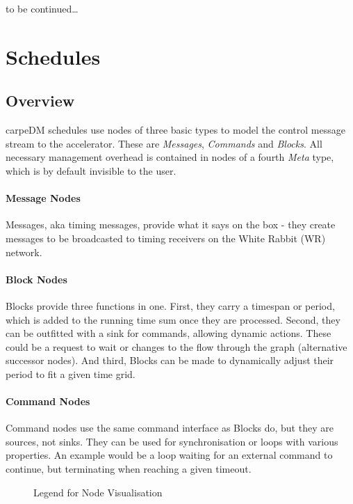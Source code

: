 to be continued\dots

\section{Schedules}

\subsection{Overview}

carpeDM schedules use nodes of three basic types to model the control message stream to the accelerator. These are \emph{Messages}, \emph{Commands} and \emph{Blocks}. All necessary management overhead is contained in nodes of a fourth \emph{Meta} type, which is by default invisible to the user.

\paragraph{Message Nodes}
Messages, aka timing messages, provide what it says on the box - they create messages to be broadcasted to timing receivers on the White Rabbit (WR) network.
\paragraph{Block Nodes}
Blocks provide three functions in one. First, they carry a timespan or period, which is added to the running time sum once they are processed. Second, they can be outfitted with a sink for commands, allowing dynamic actions. These could be a request to wait or changes to the flow through the graph (alternative successor nodes). And third, Blocks can be made to dynamically adjust their period to fit a given time grid.
\paragraph{Command Nodes} Command nodes use the same command interface as Blocks do, but they are sources, not sinks. They can be used for synchronisation or loops with various properties. An example would be a loop waiting for an external command to continue, but terminating when reaching a given timeout.

\begin{figure}[H]
\def\svgwidth{0.8\textwidth}
\graphicspath{{Figures/}}

\caption{Legend for Node Visualisation }
\label{fig:legend_nodes}
\end{figure}

